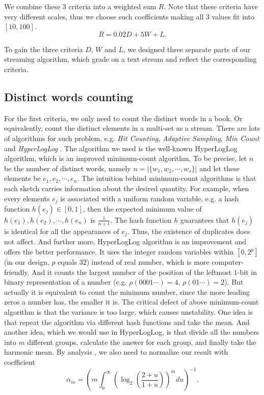 \documentclass{article}
\begin{document}
	We combine these $3$ criteria into a weighted sum $R$. Note that these criteria have very different scales, thus we choose such coefficients
	making all $3$ values fit into $[10, 100]$.
	\[R = 0.02D + 5W + L.\]

	To gain the three criteria $D$, $W$ and $L$, we designed three separate parts of our streaming algorithm, which grade on a text stream and
	reflect the corresponding criteria.

\subsection{Distinct words counting}
		For the first criteria, we only need to count the distinct words in a book. Or equivalently, count the distinct elements
		in a multi-set as a stream. There are lots of algorithms for such problem, e.g. \textit{Hit Counting}, \textit{Adaptive Sampling},
		\textit{Min Count} \cite{cosma} and \textit{HyperLogLog} \cite{hyper}.
		The algorithm we used is the well-known HyperLogLog algorithm, which is an improved
		minimum-count algorithm.
\newline
\newline
		To be precise, let $n$ be the number of distinct words,
		namely $n = | \{w_1, w_2, \cdots, w_s\} |$ and let these elements be $e_1, e_2, \cdots, e_n$.
		The intuition behind minimum-count algorithms is that each sketch carries information about the desired quantity. For example, when every
		elements $e_j$ is associated with a uniform random variable, e.g. a hash function $h(e_j) \in [0, 1]$, then the expected minimum value
		of $h(e_1), h(e_2), \cdots, h(e_n)$ is $\frac{1}{n + 1}$. The hash function $h$ guarantees that $h(e_j)$ is identical for all the
		appearances of $e_j$. Thus, the existence of duplicates does not affect.
	\newline
	\newline
		And further more, HyperLogLog algorithm is an improvement and offers the better performance. It uses the integer random variables within
		$[0, 2^p]$ (in our design, $p$ equals $32$) instead of real number, which is more computer-friendly. And it counts the largest number
		of the position of the leftmost $1$-bit in binary representation of a number (e.g. $\rho(0001\cdots) = 4$, $\rho(01\cdots) = 2$).
		But actually it is equivalent to count the minimum number, since the more leading zeros a number has, the smaller it is.
		The critical defect of above minimum-count algorithm is that the variance is too large, which causes unstability. One idea is that
		repeat the algorithm via different hash functions and take the mean. And another idea, which we would use in HyperLogLog, is that
		divide all the numbers into $m$ different groups, calculate the answer for each group, and finally take the harmonic mean.
	\newline
	\newline
		By analysis \cite{hyper}, we also need to normalize our result with coefficient
		\[ \alpha_m = ( m \int_0^\infty (\log_2(\frac{2 + u}{1 + u}))^m du)^{-1}. \]
\end{document}

